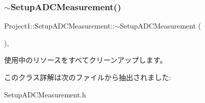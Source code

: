 \subsubsection{\texorpdfstring{$\sim$\+Setup\+A\+D\+C\+Measurement()}{~SetupADCMeasurement()}}
{\footnotesize\ttfamily Project1\+::\+Setup\+A\+D\+C\+Measurement\+::$\sim$\+Setup\+A\+D\+C\+Measurement (\begin{DoxyParamCaption}{ }\end{DoxyParamCaption})\hspace{0.3cm}{\ttfamily [inline]}, {\ttfamily [protected]}}



使用中のリソースをすべてクリーンアップします。 



このクラス詳解は次のファイルから抽出されました\+:\begin{DoxyCompactItemize}
\item 
Setup\+A\+D\+C\+Measurement.\+h\end{DoxyCompactItemize}
